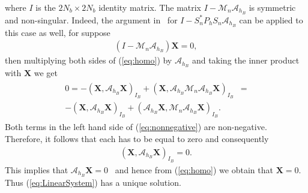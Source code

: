 \documentclass[preprint,12pt]{elsarticle}
\begin{document}
where $\mathit{I}$ is the $2N_b\times 2N_b$ identity matrix.
The matrix $\mathit{I}- \mathcal{M}_n\mathcal{A}_{h_B}$ is symmetric and non-singular. Indeed, the argument in~\cite{TP92} for $\mathit{I}- S^*_n P_h S_n \mathcal{A}_{h_B}$ can be applied to this case as well, for suppose
\begin{align}
(\mathit{I}- \mathcal{M}_n\mathcal{A}_{h_B}) \mathbf{X} =0, \label{eq:homo}
\end{align}
then multiplying both sides of (\ref{eq:homo}) by $\mathcal{A}_{h_B}$ and taking the inner product
with $\mathbf{X}$ we get
\begin{align}
\begin{split}
0=-(\mathbf{X}, \mathcal{A}_{h_B}\mathbf{X})_{I_B} + (\mathbf{X},\mathcal{A}_{h_B}\mathcal{M}_ n\mathcal{A}_{h_B} \mathbf{X})_{I_B} &= \\
-(\mathbf{X}, \mathcal{A}_{h_B}\mathbf{X})_{I_B} + (\mathcal{A}_{h_B}\mathbf{X},\mathcal{M}_n \mathcal{A}_{h_B} \mathbf{X})_{I_B} .
\end{split}
  \label{eq:nonnegative}
\end{align}
 Both terms in the left hand side of (\ref{eq:nonnegative}) are non-negative. Therefore, it follows that each has to be equal to zero and consequently
\begin{align}
(\mathbf{X},\mathcal{A}_{h_B}\mathbf{X})_{I_B} =0. 
\end{align}
This implies that $\mathcal{A}_{h_B}\mathbf{X}=0$~\cite{TP92} and hence from (\ref{eq:homo}) we obtain that 
$\mathbf{X}=0$. Thus (\ref{eq:LinearSystem}) has a unique solution.
\end{document}
